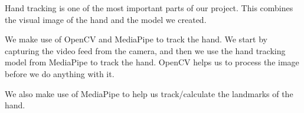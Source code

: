 \documentclass[../paper.tex]{subfiles}
\begin{document}
    Hand tracking is one of the most important parts of our project. 
    This combines the visual image of the hand and the model we created.

    We make use of OpenCV\cite{l0} and MediaPipe\cite{l2} to track the hand.
    We start by capturing the video feed from the camera, and then we use the hand tracking model from MediaPipe to track the hand.
    OpenCV helps us to process the image before we do anything with it.

    We also make use of MediaPipe to help us track/calculate the landmarks of the hand.
\end{document}
